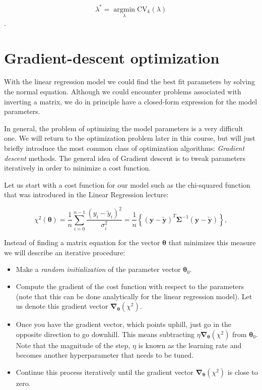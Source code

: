 \documentclass[%
oneside,                 %
final,                   %
10pt]{article}
\begin{document}
\noindent
\[
\lambda^* = \underset{\lambda}{\operatorname{argmin}}
\mathrm{CV}_k(\lambda)
\].



\section{Gradient-descent optimization}

With the linear regression model we could find the best fit parameters by solving the normal equation. Although we could encounter problems associated with inverting a matrix, we do in principle have a closed-form expression for the model parameters.

In general, the problem of optimizing the model parameters is a very difficult one. We will return to the optimization problem later in this course, but will just briefly introduce the most common class of optimization algorithms: \emph{Gradient descent} methods. The general idea of Gradient descent is to tweak parameters iteratively in order to minimize a cost function.

Let us start with a cost function for our model such as the chi-squared function that was introduced in the Linear Regression lecture:

\[
\chi^2(\bm{\theta})=\frac{1}{n}\sum_{i=0}^{n-1}\frac{\left(y_i-\tilde{y}_i\right)^2}{\sigma_i^2}=\frac{1}{n}\left\{\left(\bm{y}-\bm{\tilde{y}}\right)^T \bm{\Sigma}^{-1}\left(\bm{y}-\bm{\tilde{y}}\right)\right\},
\]

Instead of finding a matrix equation for the vector $\bm{\theta}$ that minimizes this measure we will describe an iterative procedure:

\begin{itemize}
\item Make a \emph{random initialization} of the parameter vector $\bm{\theta}_0$.

\item Compute the gradient of the cost function with respect to the parameters (note that this can be done analytically for the linear regression model). Let us denote this gradient vector $\bm{\nabla}_{\bm{\theta}} \left( \chi^2 \right)$.

\item Once you have the gradient vector, which points uphill, just go in the opposite direction to go downhill. This means subtracting $\eta \bm{\nabla}_{\bm{\theta}} \left( \chi^2 \right)$ from $\bm{\theta}_0$. Note that the magnitude of the step, $\eta$ is known as the learning rate and becomes another hyperparameter that needs to be tuned.

\item Continue this process iteratively until the gradient vector $\bm{\nabla}_{\bm{\theta}} \left( \chi^2 \right)$ is close to zero.
\end{itemize}
\end{document}
